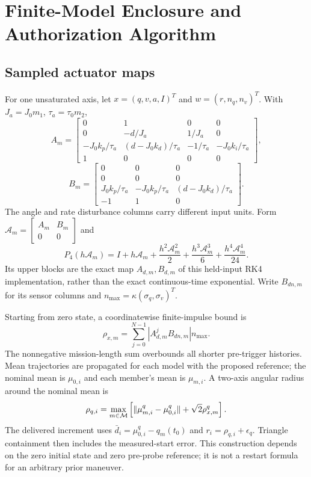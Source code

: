 \section{Finite-Model Enclosure and Authorization Algorithm}
\subsection{Sampled actuator maps}
For one unsaturated axis, let $x=(q,v,a,I)^T$ and $w=(r,n_q,n_v)^T$. With $J_a=J_0m_1$, $\tau_a=\tau_0m_2$,
\begin{equation}
A_m=\begin{bmatrix}
0&1&0&0\\0&-d/J_a&1/J_a&0\\
-J_0k_p/\tau_a&(d-J_0k_d)/\tau_a&-1/\tau_a&-J_0k_i/\tau_a\\
1&0&0&0
\end{bmatrix},
\end{equation}
\begin{equation}
B_m=\begin{bmatrix}0&0&0\\0&0&0\\J_0k_p/\tau_a&-J_0k_p/\tau_a&(d-J_0k_d)/\tau_a\\-1&1&0\end{bmatrix}.
\end{equation}
The angle and rate disturbance columns carry different input units. Form $\mathcal A_m=\begin{bmatrix}A_m&B_m\\0&0\end{bmatrix}$ and
\begin{equation}
P_4(h\mathcal A_m)=I+h\mathcal A_m+
\frac{h^2\mathcal A_m^2}{2}+\frac{h^3\mathcal A_m^3}{6}+\frac{h^4\mathcal A_m^4}{24}.
\end{equation}
Its upper blocks are the exact map $A_{d,m},B_{d,m}$ of this held-input RK4 implementation, rather than the exact continuous-time exponential. Write $B_{dn,m}$ for its sensor columns and $n_{\max}=\kappa(\sigma_q,\sigma_v)^T$.

Starting from zero state, a coordinatewise finite-impulse bound is
\begin{equation}
\rho_{x,m}=\sum_{j=0}^{N-1}|A_{d,m}^{j}B_{dn,m}|n_{\max}.
\label{eq:impulse}
\end{equation}
The nonnegative mission-length sum overbounds all shorter pre-trigger histories. Mean trajectories are propagated for each model with the proposed reference; the nominal mean is $\mu_{0,i}$ and each member's mean is $\mu_{m,i}$. A two-axis angular radius around the nominal mean is
\begin{equation}
\rho_{q,i}=\max_{m\in\mathcal M}\left[
\lVert\mu_{m,i}^{q}-\mu_{0,i}^{q}\rVert+\sqrt2\rho_{x,m}^{q}\right].
\end{equation}
The delivered increment uses $\bar d_i=\mu_{0,i}^{q}-q_m(t_0)$ and $r_i=\rho_{q,i}+\epsilon_q$. Triangle containment then includes the measured-start error. This construction depends on the zero initial state and zero pre-probe reference; it is not a restart formula for an arbitrary prior maneuver.

